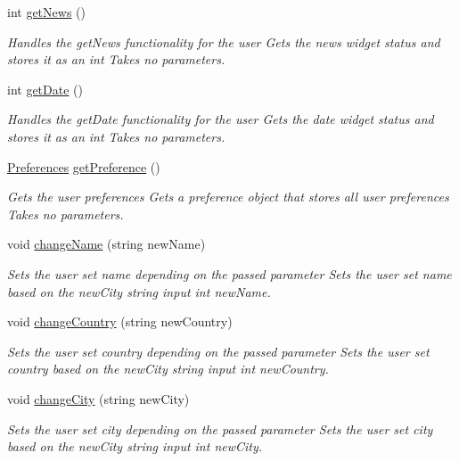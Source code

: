 \begin{DoxyCompactItemize}
int \mbox{\hyperlink{classuser_sign_in_a6a22de24799069874818c381a9764bb7}{get\+News}} ()
\begin{DoxyCompactList}\small\item\em Handles the get\+News functionality for the user  Gets the news widget status and stores it as an int  Takes no parameters. \end{DoxyCompactList}\item 
int \mbox{\hyperlink{classuser_sign_in_ab6980000d41f064c48c751d7ff9a0cd8}{get\+Date}} ()
\begin{DoxyCompactList}\small\item\em Handles the get\+Date functionality for the user  Gets the date widget status and stores it as an int  Takes no parameters. \end{DoxyCompactList}\item 
\mbox{\hyperlink{class_preferences}{Preferences}} \mbox{\hyperlink{classuser_sign_in_aaaa506b746cbef56014006a673b239d7}{get\+Preference}} ()
\begin{DoxyCompactList}\small\item\em Gets the user preferences  Gets a preference object that stores all user preferences  Takes no parameters. \end{DoxyCompactList}\item 
void \mbox{\hyperlink{classuser_sign_in_a2c60d720f5c473379048f7339faa3bf1}{change\+Name}} (string new\+Name)
\begin{DoxyCompactList}\small\item\em Sets the user set name depending on the passed parameter  Sets the user set name based on the new\+City string input  int new\+Name. \end{DoxyCompactList}\item 
void \mbox{\hyperlink{classuser_sign_in_a81a17024250723ca6f6a51417f46db15}{change\+Country}} (string new\+Country)
\begin{DoxyCompactList}\small\item\em Sets the user set country depending on the passed parameter  Sets the user set country based on the new\+City string input  int new\+Country. \end{DoxyCompactList}\item 
void \mbox{\hyperlink{classuser_sign_in_ab6ad3c051be80088c9ac4df4a48c02c6}{change\+City}} (string new\+City)
\begin{DoxyCompactList}\small\item\em Sets the user set city depending on the passed parameter  Sets the user set city based on the new\+City string input  int new\+City. \end{DoxyCompactList}\item 

\end{DoxyCompactItemize}
